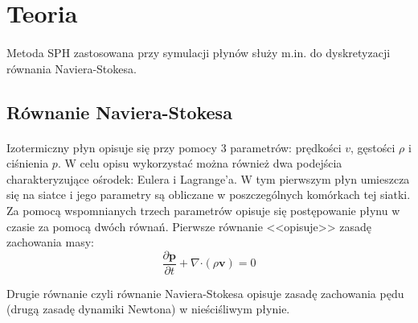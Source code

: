 \newpage

\section{Teoria}

\paragraph{}
Metoda SPH zastosowana przy symulacji płynów służy m.in. do dyskretyzacji równania Naviera-Stokesa.
\par

\subsection{Równanie Naviera-Stokesa}
\label{subsec:navier_stokes_ss}

\paragraph{}
Izotermiczny płyn opisuje się przy pomocy 3 parametrów: prędkości $v$, gęstości $\rho$ i ciśnienia $p$. W celu opisu wykorzystać można również dwa podejścia charakteryzujące ośrodek: Eulera i Lagrange'a. W tym pierwszym płyn umieszcza się na siatce i jego parametry są obliczane w poszczególnych komórkach tej siatki. Za pomocą wspomnianych trzech parametrów opisuje się postępowanie płynu w czasie za pomocą dwóch równań. Pierwsze równanie <<opisuje>> zasadę zachowania masy:
\begin{equation}
\frac{\partial \boldsymbol{p}}{\partial t} + \nabla \boldsymbol{\cdot} (\rho \boldsymbol{v}) = 0
\label{eqn:mass_conservation}
\end{equation}

Drugie równanie czyli równanie Naviera-Stokesa opisuje zasadę zachowania pędu (drugą zasadę dynamiki Newtona) w nieściśliwym płynie.

